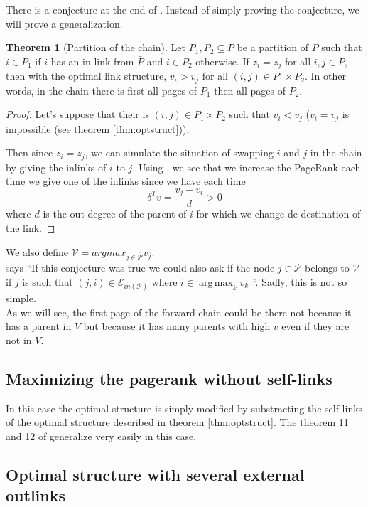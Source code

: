 \documentclass{article}
\DeclareMathOperator*{\argmax}{arg\,max}
\newcommand{\1}{\mathbf{1}}
\theoremstyle{definition}
\newtheorem{mytheo}[mydef]{Theorem}
\begin{document}
There is a conjecture at the end of \cite{de2008maximizing}.
Instead of simply proving the conjecture, we will prove a generalization.
\begin{mytheo}[Partition of the chain]
  \label{theo:partition}
  Let $P_1,P_2 \subseteq P$ be a partition of $P$ such that
  $i \in P_1$ if $i$ has an in-link from $\bar{P}$ and $i \in P_2$
  otherwise.
  If $z_i = z_j$ for all $i,j \in P$,
  then with the optimal link structure,
  $v_i > v_j$ for all $(i,j) \in P_1 \times P_2$.
  In other words, in the chain there is first all pages of
  $P_1$ then all pages of $P_2$.
  \begin{proof}
    Let's suppose that their is $(i,j) \in P_1 \times P_2$
    such that $v_i < v_j$ ($v_i = v_j$ is impossible (see theorem \ref{thm:optstruct})).

    Then since $z_i = z_j$, we can simulate the situation of swapping $i$ and $j$ in the chain
    by giving the inlinks of $i$ to $j$.
    Using \cite[theorem~5]{de2008maximizing}, we see that we increase the PageRank each time we give one of the inlinks since
    we have each time
    \[ \delta^Tv = \frac{v_j - v_i}{d} > 0 \]
    where $d$ is the out-degree of the parent of $i$ for which we change de destination of the link.
  \end{proof}
\end{mytheo}
We also define $\mathcal{V} = argmax_{j\in \overline{\mathcal{P}}}v_j$. \\
\cite{de2008maximizing} says
``If this conjecture was true we could also ask if the node $j \in \mathcal{P}$ belongs to $\mathcal{V}$ if $j$ is such that
$(j, i) \in \mathcal{E}_{in(\mathcal{P})}$ where $i \in \argmax_k v_k$ ''.
Sadly, this is not so simple. \\
As we will see, the first page of the forward chain could be there not
because it has a parent in $V$ but because it has many parents with high $v$ even if they are not in $V$.

\subsection{Maximizing the pagerank without self-links}
In this case the optimal structure is simply modified by substracting the self links of the optimal structure described in theorem \ref{thm:optstruct}. The theorem 11 and 12 of \cite{de2008maximizing} generalize very easily in this case.

\subsection{Optimal structure with several external outlinks}
\end{document}
